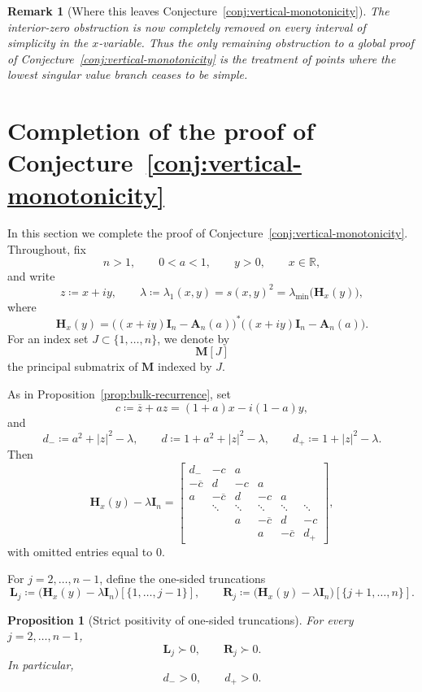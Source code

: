 \documentclass[11pt]{article}
\newtheorem{proposition}[theorem]{Proposition}
\newtheorem{remark}[theorem]{Remark}
\begin{document}
\begin{remark}[Where this leaves Conjecture~\ref{conj:vertical-monotonicity}]
The interior-zero obstruction is now completely removed on every interval of simplicity in the
\(x\)-variable. Thus the only remaining obstruction to a global proof of
Conjecture~\ref{conj:vertical-monotonicity} is the treatment of points where the lowest singular
value branch ceases to be simple.
\end{remark}

\section{Completion of the proof of Conjecture~\ref{conj:vertical-monotonicity}}

In this section we complete the proof of Conjecture~\ref{conj:vertical-monotonicity}.
Throughout, fix
\[
n>1,\qquad 0<a<1,\qquad y>0,\qquad x\in\mathbb R,
\]
and write
\[
z\coloneqq x+iy,
\qquad
\lambda\coloneqq \lambda_1(x,y)=s(x,y)^2=\lambda_{\min}\!\bigl(\mathbf H_x(y)\bigr),
\]
where
\[
\mathbf H_x(y)=\bigl((x+iy)\mathbf I_n-\mathbf A_n(a)\bigr)^*\bigl((x+iy)\mathbf I_n-\mathbf A_n(a)\bigr).
\]
For an index set \(J\subset\{1,\dots,n\}\), we denote by
\[
\mathbf M[J]
\]
the principal submatrix of \(\mathbf M\) indexed by \(J\).

As in Proposition~\ref{prop:bulk-recurrence}, set
\[
c\coloneqq \overline z + a z=(1+a)x-i(1-a)y,
\]
and
\[
d_-\coloneqq a^2+|z|^2-\lambda,
\qquad
d\coloneqq 1+a^2+|z|^2-\lambda,
\qquad
d_+\coloneqq 1+|z|^2-\lambda.
\]
Then
\[
\mathbf H_x(y)-\lambda\mathbf I_n
=
\begin{bmatrix}
d_- & -c & a \\
-\overline c & d & -c & a \\
a & -\overline c & d & -c & a \\
& \ddots & \ddots & \ddots & \ddots & \ddots \\
&& a & -\overline c & d & -c\\
&&& a & -\overline c & d_+
\end{bmatrix},
\]
with omitted entries equal to \(0\).

For \(j=2,\dots,n-1\), define the one-sided truncations
\[
\mathbf L_j\coloneqq \bigl(\mathbf H_x(y)-\lambda\mathbf I_n\bigr)[\{1,\dots,j-1\}],
\qquad
\mathbf R_j\coloneqq \bigl(\mathbf H_x(y)-\lambda\mathbf I_n\bigr)[\{j+1,\dots,n\}].
\]

\begin{proposition}[Strict positivity of one-sided truncations]\label{prop:one-sided-truncations-positive}
For every \(j=2,\dots,n-1\),
\[
\mathbf L_j\succ 0,
\qquad
\mathbf R_j\succ 0.
\]
In particular,
\[
d_->0,
\qquad
d_+>0.
\]
\end{proposition}
\end{document}
